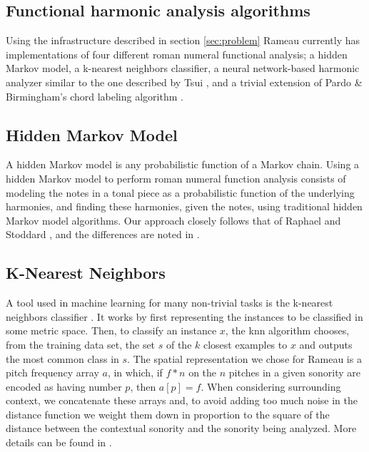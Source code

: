 \documentclass[a0paper]{sciposter}
\begin{document}
\begin{multicols}{3}
\section{Functional harmonic analysis algorithms}
\label{sec:algorithms}

Using the infrastructure described in section \ref{sec:problem}
Rameau currently has implementations of four different roman numeral
functional analysis; a hidden Markov model, a k-nearest neighbors
classifier, a neural network-based harmonic analyzer similar to the
one described by Tsui \cite{tsui02:harmonic}, and a trivial extension
of Pardo \& Birmingham's chord labeling algorithm
\cite{pardo.ea99:automated}.

\subsection{Hidden Markov Model}
\label{sec:hidden-markov-model}

A hidden Markov model is any probabilistic function of a Markov
chain. Using a hidden Markov model to perform roman numeral function
analysis consists of modeling the notes in a tonal piece as a
probabilistic function of the underlying harmonies, and finding these
harmonies, given the notes, using traditional hidden Markov model
algorithms. Our approach closely follows that of Raphael and Stoddard
\cite{raphael.ea03:harmonic}, and the differences are noted in
\cite{passos08:modelos}.


\subsection{K-Nearest Neighbors}
\label{sec:knn}

A tool used in machine learning for many non-trivial tasks is the
k-nearest neighbors classifier \cite{mitchell97:machine}. It works by
first representing the instances to be classified in some metric
space. Then, to classify an instance $x$, the knn algorithm chooses,
from the training data set, the set $s$ of the $k$ closest examples to
$x$ and outputs the most common class in $s$. The spatial
representation we chose for Rameau is a pitch frequency array $a$, in
which, if $f*n$ on the $n$ pitches in a given sonority are encoded as
having number $p$, then $a[p] = f$. When considering surrounding
context, we concatenate these arrays and, to avoid adding too much
noise in the distance function we weight them down in proportion to
the square of the distance between the contextual sonority and the
sonority being analyzed. More details can be found in
\cite{passos08:modelos}.


\end{multicols}
\end{document}
